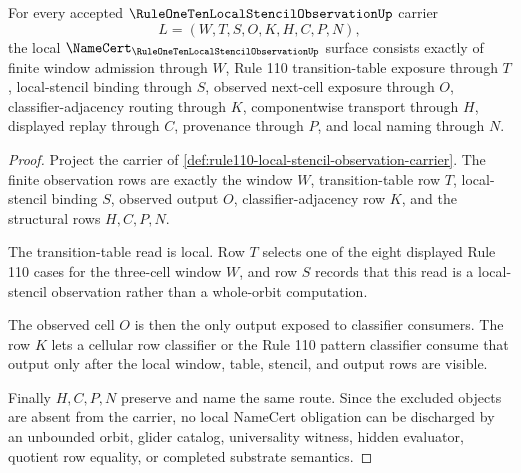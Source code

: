 \begin{theorem}
\label{thm:rule110-local-stencil-observation-namecert-obligations}
For every accepted $\RuleOneTenLocalStencilObservationUp$ carrier
$$
L=(W,T,S,O,K,H,C,P,N),
$$
the local $\NameCert_{\RuleOneTenLocalStencilObservationUp}$ surface consists exactly of finite window admission through $W$, Rule 110 transition-table exposure through $T$, local-stencil binding through $S$, observed next-cell exposure through $O$, classifier-adjacency routing through $K$, componentwise transport through $H$, displayed replay through $C$, provenance through $P$, and local naming through $N$.
\end{theorem}
\begin{proof}
Project the carrier of \autoref{def:rule110-local-stencil-observation-carrier}. The finite observation rows are exactly the window $W$, transition-table row $T$, local-stencil binding $S$, observed output $O$, classifier-adjacency row $K$, and the structural rows $H,C,P,N$.

The transition-table read is local. Row $T$ selects one of the eight displayed Rule 110 cases for the three-cell window $W$, and row $S$ records that this read is a local-stencil observation rather than a whole-orbit computation.

The observed cell $O$ is then the only output exposed to classifier consumers. The row $K$ lets a cellular row classifier or the Rule 110 pattern classifier consume that output only after the local window, table, stencil, and output rows are visible.

Finally $H,C,P,N$ preserve and name the same route. Since the excluded objects are absent from the carrier, no local NameCert obligation can be discharged by an unbounded orbit, glider catalog, universality witness, hidden evaluator, quotient row equality, or completed substrate semantics.
\end{proof}

